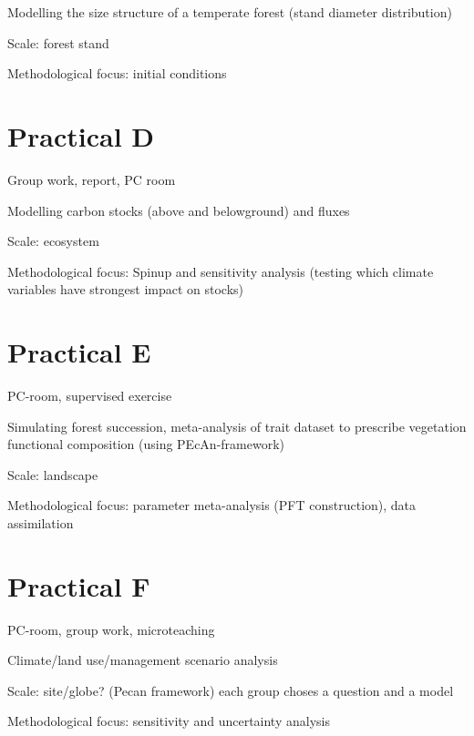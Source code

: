 \documentclass[oneside]{book}
\begin{document}
Modelling the size structure of a temperate forest (stand diameter
distribution)

Scale: forest stand

Methodological focus: initial conditions

\chapter*{Practical D}\label{practical-d}

Group work, report, PC room

Modelling carbon stocks (above and belowground) and fluxes

Scale: ecosystem

Methodological focus: Spinup and sensitivity analysis (testing which
climate variables have strongest impact on stocks)

\chapter*{Practical E}\label{practical-e}

PC-room, supervised exercise

Simulating forest succession, meta-analysis of trait dataset to
prescribe vegetation functional composition (using PEcAn-framework)

Scale: landscape

Methodological focus: parameter meta-analysis (PFT construction), data
assimilation

\chapter*{Practical F}\label{practical-f}

PC-room, group work, microteaching

Climate/land use/management scenario analysis

Scale: site/globe? (Pecan framework) each group choses a question and a
model

Methodological focus: sensitivity and uncertainty analysis


\end{document}
